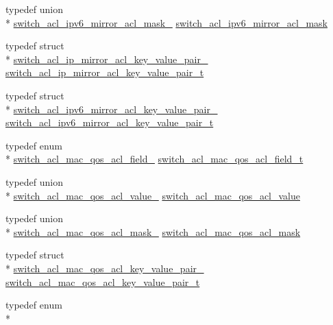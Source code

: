 \begin{DoxyCompactItemize}
\item 
typedef union \\*
\hyperlink{unionswitch__acl__ipv6__mirror__acl__mask__}{switch\+\_\+acl\+\_\+ipv6\+\_\+mirror\+\_\+acl\+\_\+mask\+\_\+} \hyperlink{group__ACL_ga12e6b294beab0f491c464b9039e8637c}{switch\+\_\+acl\+\_\+ipv6\+\_\+mirror\+\_\+acl\+\_\+mask}
\item 
typedef struct \\*
\hyperlink{structswitch__acl__ip__mirror__acl__key__value__pair__}{switch\+\_\+acl\+\_\+ip\+\_\+mirror\+\_\+acl\+\_\+key\+\_\+value\+\_\+pair\+\_\+} \hyperlink{group__ACL_ga444ddc731a4339c431f4a5f8599ad4a8}{switch\+\_\+acl\+\_\+ip\+\_\+mirror\+\_\+acl\+\_\+key\+\_\+value\+\_\+pair\+\_\+t}
\item 
typedef struct \\*
\hyperlink{structswitch__acl__ipv6__mirror__acl__key__value__pair__}{switch\+\_\+acl\+\_\+ipv6\+\_\+mirror\+\_\+acl\+\_\+key\+\_\+value\+\_\+pair\+\_\+} \hyperlink{group__ACL_ga58c93d7863e42b08f7ff3ec940dde534}{switch\+\_\+acl\+\_\+ipv6\+\_\+mirror\+\_\+acl\+\_\+key\+\_\+value\+\_\+pair\+\_\+t}
\item 
typedef enum \\*
\hyperlink{group__ACL_gaeab9e985d023f151701d8cca10e0f377}{switch\+\_\+acl\+\_\+mac\+\_\+qos\+\_\+acl\+\_\+field\+\_\+} \hyperlink{group__ACL_gaf6ac582ebd67bbb370eaa31e056673ed}{switch\+\_\+acl\+\_\+mac\+\_\+qos\+\_\+acl\+\_\+field\+\_\+t}
\item 
typedef union \\*
\hyperlink{unionswitch__acl__mac__qos__acl__value__}{switch\+\_\+acl\+\_\+mac\+\_\+qos\+\_\+acl\+\_\+value\+\_\+} \hyperlink{group__ACL_gadccedff518f9535942f1b44892d34606}{switch\+\_\+acl\+\_\+mac\+\_\+qos\+\_\+acl\+\_\+value}
\item 
typedef union \\*
\hyperlink{unionswitch__acl__mac__qos__acl__mask__}{switch\+\_\+acl\+\_\+mac\+\_\+qos\+\_\+acl\+\_\+mask\+\_\+} \hyperlink{group__ACL_ga5d9712a348fc935b7b85f24e1eb59c44}{switch\+\_\+acl\+\_\+mac\+\_\+qos\+\_\+acl\+\_\+mask}
\item 
typedef struct \\*
\hyperlink{structswitch__acl__mac__qos__acl__key__value__pair__}{switch\+\_\+acl\+\_\+mac\+\_\+qos\+\_\+acl\+\_\+key\+\_\+value\+\_\+pair\+\_\+} \hyperlink{group__ACL_ga7023601e2491d104926805e7f6b6c172}{switch\+\_\+acl\+\_\+mac\+\_\+qos\+\_\+acl\+\_\+key\+\_\+value\+\_\+pair\+\_\+t}
\item 
typedef enum \\*

\end{DoxyCompactItemize}
